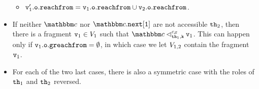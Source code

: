 \begin{itemize}
\begin{itemize}
  \item $\mathtt{v}_1'.\mathtt{o}.\mathtt{reachfrom} = \mathtt{v}_{1}.\mathtt{o}.\mathtt{reachfrom} \cup \mathtt{v}_{2}.\mathtt{o}.\mathtt{reachfrom}$.
    \end{itemize}
\item
  If neither $\cell$ nor
  $\cell.{\tt next[1]}$  are not accessible  ${\tt th}_2$, then
  there is a  fragment $\mathtt{v}_1 \in V_1$
  such that $\cell \lsatfrag{\klevel}{\thread_1}{\sconf} \frag_1$.
  This can happen only if
  $\mathtt{v}_1.\mathtt{o}.\mathtt{greachfrom} = \emptyset$,
  in which case we let  $V_{1,2}$ contain the fragment
  $\mathtt{v}_1$.
\item
  For each of the two last cases, there is also a symmetric case with the
  roles of ${\tt th}_1$ and ${\tt th}_2$ reversed.
\end{itemize}



